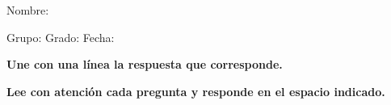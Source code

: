 \documentclass[12pt,addpoints]{exam}
\begin{document}
%

Nombre:\enspace\hrulefill

\vspace{5mm}

Grupo:\enspace\hrulefill
\enspace{}Grado:\enspace\hrulefill
\enspace{}Fecha:\enspace\hrulefill

\begin{questions}

\begin{EnvFullwidth}
  \sffamily\textbf{Une con una línea la respuesta que corresponde.}
\end{EnvFullwidth}



\begin{EnvFullwidth}
  \sffamily\textbf{Lee con atención cada pregunta y responde en
  el espacio indicado. }
\end{EnvFullwidth}






\end{questions}
\end{document}
